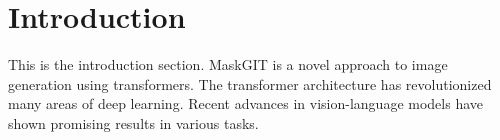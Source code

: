 \section{Introduction}
This is the introduction section. MaskGIT \cite{chang2022maskgit} is a novel approach to image generation using transformers. The transformer architecture \cite{vaswani2017attention} has revolutionized many areas of deep learning. Recent advances in vision-language models \cite{radford2021learning} have shown promising results in various tasks.

